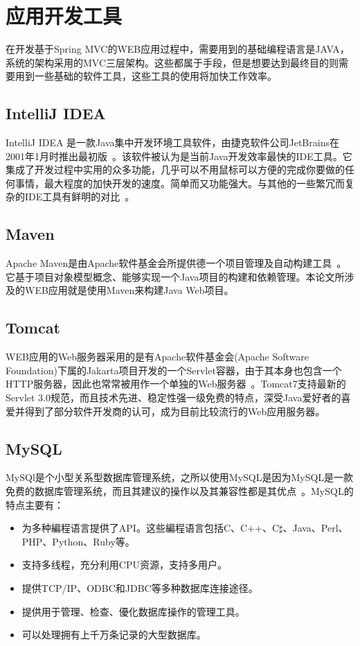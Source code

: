 \section{应用开发工具}
在开发基于Spring MVC的WEB应用过程中，需要用到的基础编程语言是JAVA，系统的架构采用的MVC三层架构。这些都属于手段，但是想要达到最终目的则需要用到一些基础的软件工具，这些工具的使用将加快工作效率。
\subsection{IntelliJ IDEA}
IntelliJ IDEA 是一款Java集中开发环境工具软件，由捷克软件公司JetBrains在2001年1月时推出最初版~\cite{jemerov2008implementing}。该软件被认为是当前Java开发效率最快的IDE工具。它集成了开发过程中实用的众多功能，几乎可以不用鼠标可以方便的完成你要做的任何事情，最大程度的加快开发的速度。简单而又功能强大。与其他的一些繁冗而复杂的IDE工具有鲜明的对比~\cite{IDEA维基百科}。
\subsection{Maven}
Apache Maven是由Apache软件基金会所提供德一个项目管理及自动构建工具~\cite{smart2005introduction}。它基于项目对象模型概念、能够实现一个Java项目的构建和依赖管理。本论文所涉及的WEB应用就是使用Maven来构建Java Web项目。
\subsection{Tomcat}
WEB应用的Web服务器采用的是有Apache软件基金会(Apache Software Foundation)下属的Jakarta项目开发的一个Servlet容器，由于其本身也包含一个HTTP服务器，因此也常常被用作一个单独的Web服务器~\cite{brittain2007tomcat}。Tomcat7支持最新的Servlet 3.0规范，而且技术先进、稳定性强一级免费的特点，深受Java爱好者的喜爱并得到了部分软件开发商的认可，成为目前比较流行的Web应用服务器。
\subsection{MySQL}
MySQl是个小型关系型数据库管理系统，之所以使用MySQL是因为MySQL是一款免费的数据库管理系统，而且其建议的操作以及其兼容性都是其优点~\cite{greenspan2001mysql}。MySQL的特点主要有：
\begin{itemize}
\item 为多种編程语言提供了API。这些編程语言包括C、C++、C$\sharp$、Java、Perl、PHP、Python、Ruby等。
\item 支持多线程，充分利用CPU资源，支持多用户。
\item 提供TCP/IP、ODBC和JDBC等多种数据库连接途径。
\item 提供用于管理、检查、優化数据库操作的管理工具。
\item 可以处理拥有上千万条记录的大型数据库。
\end{itemize}
